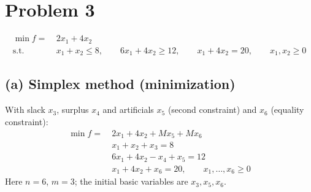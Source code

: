 \documentclass[11pt,a4paper]{article}
\begin{document}
\newpage
\section{Problem 3}
\begin{align*}
\min f=\ & 2x_1+4x_2\\
\text{s.t. } & x_1+x_2\le 8,\qquad 6x_1+4x_2\ge 12,\qquad x_1+4x_2=20,\qquad x_1,x_2\ge 0
\end{align*}

\subsection*{(a) Simplex method (minimization)}
With slack $x_3$, surplus $x_4$ and artificials $x_5$ (second constraint) and $x_6$ (equality constraint):
\begin{align*}
\min f=\ & 2x_1+4x_2+Mx_5+Mx_6\\
& x_1+x_2+x_3=8\\
& 6x_1+4x_2-x_4+x_5=12\\
& x_1+4x_2+x_6=20,\qquad x_1,\dots,x_6\ge 0
\end{align*}
Here $n=6$, $m=3$; the initial basic variables are $x_3,x_5,x_6$.
\end{document}
